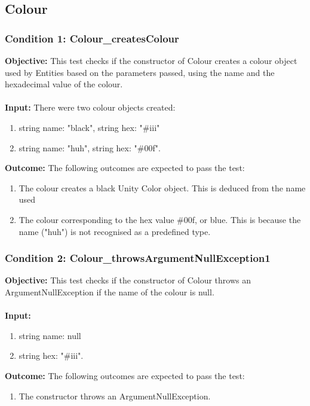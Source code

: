 \documentclass[a4paper,12pt]{article}
\begin{document}
	\subsection{Colour}
		\subsubsection{Condition 1: Colour\_createsColour}
			\textbf{Objective:} This test checks if the constructor of Colour creates a colour object used by Entities based on the parameters passed, using the name and the hexadecimal value of the colour.\\\\
			\textbf{Input:} There were two colour objects created:
				\begin{enumerate}
					\item string name: "black", string hex: "\#iii"
					\item string name: "huh", string hex: "\#00f".
				\end{enumerate}
			\textbf{Outcome:} The following outcomes are expected to pass the test:
				\begin{enumerate}
					\item The colour creates a black Unity Color object. This is deduced from the name used
					\item The colour corresponding to the hex value \#00f, or blue. This is because the name ("huh") is not recognised as a predefined type.
				\end{enumerate}
		\subsubsection{Condition 2: Colour\_throwsArgumentNullException1}
			\textbf{Objective:} This test checks if the constructor of Colour throws an ArgumentNullException if the name of the colour is null.\\\\
			\textbf{Input:} 
				\begin{enumerate}
					\item string name: null
					\item string hex: "\#iii".
				\end{enumerate}
			\textbf{Outcome:} The following outcomes are expected to pass the test:
				\begin{enumerate}
					\item The constructor throws an ArgumentNullException.
				\end{enumerate}
\end{document}
